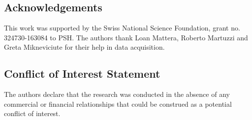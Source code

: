 \subsection*{Acknowledgements}
This work was supported by the Swiss National Science Foundation, grant no. 324730-163084 to PSH. The authors thank Loan Mattera, Roberto Martuzzi and Greta Mikneviciute for their help in data acquisition. 

\subsection*{Conflict of Interest Statement}
The authors declare that the research was conducted in the absence of any commercial or financial relationships that could be construed as a potential conflict of interest.

